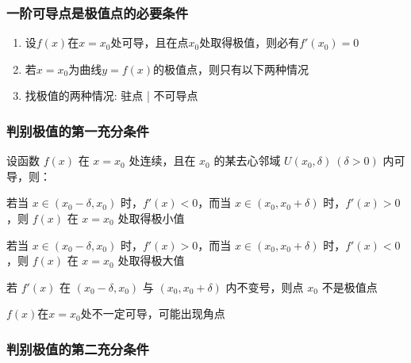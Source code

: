 \documentclass[../book.tex]{subfiles}
\begin{document}
    \subsubsection{一阶可导点是极值点的必要条件}

    \begin{enumerate}
        \item 设$f(x)$在$x = x_0$处可导，且在点$x_0$处取得极值，则必有$f'(x_0) = 0$
        \item 若$x = x_0$为曲线$y = f(x)$的极值点，则只有以下两种情况
        \item 找极值的两种情况: 驻点 | 不可导点
    \end{enumerate}

    \subsubsection{判别极值的第一充分条件}
    \begin{theorem}
        设函数 $f(x)$ 在 $x=x_0$ 处连续，且在 $x_0$ 的某去心邻域
        $U(x_0,\delta)\ (\delta>0)$ 内可导，则：

        \begin{circlenum}
            \item 若当 $x\in(x_0-\delta,x_0)$ 时，$f'(x)<0$，而当 $x\in(x_0,x_0+\delta)$ 时，$f'(x)>0$，则 $f(x)$ 在 $x=x_0$ 处取得极小值

            \item 若当 $x\in(x_0-\delta,x_0)$ 时，$f'(x)>0$，而当 $x\in(x_0,x_0+\delta)$ 时，$f'(x)<0$，则 $f(x)$ 在 $x=x_0$ 处取得极大值

            \item 若 $f'(x)$ 在 $(x_0-\delta,x_0)$ 与 $(x_0,x_0+\delta)$ 内不变号，则点 $x_0$ 不是极值点

            \item $f(x)$在$x = x_0$处不一定可导，可能出现角点
        \end{circlenum}
    \end{theorem}

    \subsubsection{判别极值的第二充分条件}
\end{document}
